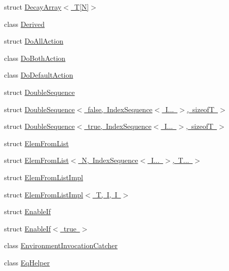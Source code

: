 \begin{DoxyCompactItemize}
struct \mbox{\hyperlink{structtesting_1_1internal_1_1_decay_array_3_01_t[_n]_4}{Decay\+Array$<$ T\mbox{[}\+N\mbox{]}$>$}}
\item 
class \mbox{\hyperlink{classtesting_1_1internal_1_1_derived}{Derived}}
\item 
struct \mbox{\hyperlink{structtesting_1_1internal_1_1_do_all_action}{Do\+All\+Action}}
\item 
class \mbox{\hyperlink{classtesting_1_1internal_1_1_do_both_action}{Do\+Both\+Action}}
\item 
class \mbox{\hyperlink{classtesting_1_1internal_1_1_do_default_action}{Do\+Default\+Action}}
\item 
struct \mbox{\hyperlink{structtesting_1_1internal_1_1_double_sequence}{Double\+Sequence}}
\item 
struct \mbox{\hyperlink{structtesting_1_1internal_1_1_double_sequence_3_01false_00_01_index_sequence_3_01_i_8_8_8_01_4_00_01sizeof_t_01_4}{Double\+Sequence$<$ false, Index\+Sequence$<$ I... $>$, sizeof\+T $>$}}
\item 
struct \mbox{\hyperlink{structtesting_1_1internal_1_1_double_sequence_3_01true_00_01_index_sequence_3_01_i_8_8_8_01_4_00_01sizeof_t_01_4}{Double\+Sequence$<$ true, Index\+Sequence$<$ I... $>$, sizeof\+T $>$}}
\item 
struct \mbox{\hyperlink{structtesting_1_1internal_1_1_elem_from_list}{Elem\+From\+List}}
\item 
struct \mbox{\hyperlink{structtesting_1_1internal_1_1_elem_from_list_3_01_n_00_01_index_sequence_3_01_i_8_8_8_01_4_00_01_t_8_8_8_01_4}{Elem\+From\+List$<$ N, Index\+Sequence$<$ I... $>$, T... $>$}}
\item 
struct \mbox{\hyperlink{structtesting_1_1internal_1_1_elem_from_list_impl}{Elem\+From\+List\+Impl}}
\item 
struct \mbox{\hyperlink{structtesting_1_1internal_1_1_elem_from_list_impl_3_01_t_00_01_i_00_01_i_01_4}{Elem\+From\+List\+Impl$<$ T, I, I $>$}}
\item 
struct \mbox{\hyperlink{structtesting_1_1internal_1_1_enable_if}{Enable\+If}}
\item 
struct \mbox{\hyperlink{structtesting_1_1internal_1_1_enable_if_3_01true_01_4}{Enable\+If$<$ true $>$}}
\item 
class \mbox{\hyperlink{classtesting_1_1internal_1_1_environment_invocation_catcher}{Environment\+Invocation\+Catcher}}
\item 
class \mbox{\hyperlink{classtesting_1_1internal_1_1_eq_helper}{Eq\+Helper}}
\item 

\end{DoxyCompactItemize}
